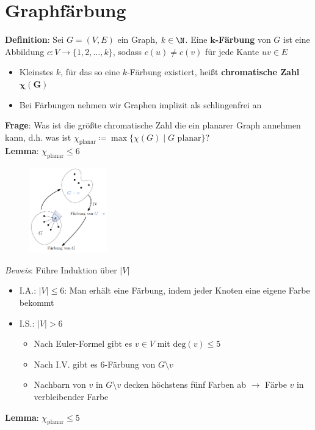\section{Graphfärbung}

\textbf{Definition}: Sei $G=(V,E)$ ein Graph, $k\in\N$. 
Eine \textbf{$\boldsymbol{k}$-Färbung} von $G$ ist eine Abbildung $c\colon V\rightarrow \{1,2,\ldots,k\}$, sodass $c(u)\neq c(v)$ für jede Kante $uv\in E$
\begin{itemize}
	\item Kleinstes $k$, für das so eine $k$-Färbung existiert, heißt \textbf{chromatische Zahl $\boldsymbol{\chi(G)}$}
	\item Bei Färbungen nehmen wir Graphen implizit als schlingenfrei an
\end{itemize}
\bigskip
\textbf{Frage}: Was ist die größte chromatische Zahl die ein planarer Graph
annehmen kann, d.h. was ist $\chi_{\text{planar}}\coloneqq\max\{\chi(G)\mid G \text{ planar}\}$?\\

\textbf{Lemma}: $\chi_{\text{planar}}\leq 6$

\begin{figure}
	\centering
	\vspace{-55pt}
	\includegraphics[width=0.3\textwidth]{images/6-f.png}
	\vspace{40pt}
	\vspace{-120pt}
\end{figure}
\textit{Beweis}: Führe Induktion über $|V|$
\begin{itemize}
	\item I.A.: $|V|\leq 6$: Man erhält eine Färbung, indem jeder Knoten eine eigene Farbe bekommt
	\item I.S.: $|V|> 6$
	\begin{itemize}
		\item Nach Euler-Formel gibt es $v\in V$ mit $\text{deg}(v)\leq 5$
		\item Nach I.V. gibt es 6-Färbung von $G\setminus v$
		\item Nachbarn von $v$ in $G\setminus v$ decken höchstens fünf Farben ab $\rightarrow$ Färbe $v$ in verbleibender Farbe
	\end{itemize}
\end{itemize}
\bigskip
\textbf{Lemma}: $\chi_{\text{planar}}\leq 5$

